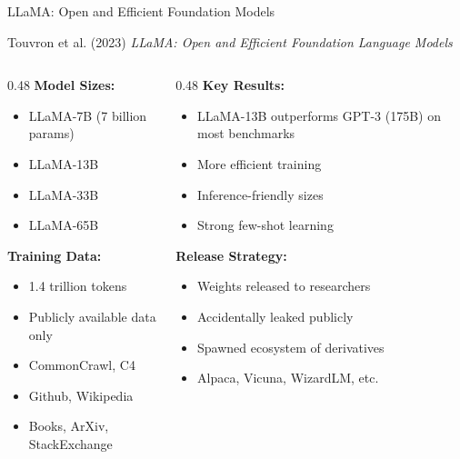 \documentclass[aspectratio=169]{beamer}
\begin{document}
\begin{frame}{LLaMA: Open and Efficient Foundation Models 🦙}
\begin{block}{Touvron et al. (2023)}
\textit{LLaMA: Open and Efficient Foundation Language Models}
\end{block}

\vspace{0.5em}

\begin{columns}[T]
\begin{column}{0.48\textwidth}
\textbf{Model Sizes:}
\begin{itemize}
    \item LLaMA-7B (7 billion params)
    \item LLaMA-13B
    \item LLaMA-33B
    \item LLaMA-65B
\end{itemize}

\vspace{0.5em}

\textbf{Training Data:}
\begin{itemize}
    \item 1.4 trillion tokens
    \item Publicly available data only
    \item CommonCrawl, C4
    \item Github, Wikipedia
    \item Books, ArXiv, StackExchange
\end{itemize}
\end{column}

\begin{column}{0.48\textwidth}
\textbf{Key Results:}
\begin{itemize}
    \item LLaMA-13B outperforms GPT-3 (175B) on most benchmarks
    \item More efficient training
    \item Inference-friendly sizes
    \item Strong few-shot learning
\end{itemize}

\vspace{0.5em}

\textbf{Release Strategy:}
\begin{itemize}
    \item Weights released to researchers
    \item Accidentally leaked publicly
    \item Spawned ecosystem of derivatives
    \item Alpaca, Vicuna, WizardLM, etc.
\end{itemize}


\end{column}
\end{columns}
\end{frame}
\end{document}

